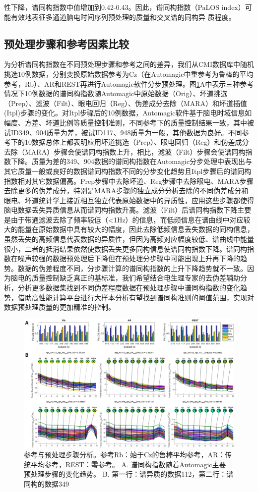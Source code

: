 性下降，谱同构指数中值增加到0.42-0.43。因此，谱同构指数（PaLOS index）可能有效地表征多通道脑电时间序列预处理的质量和交叉谱的同构异
质程度。

\subsection{预处理步骤和参考因素比较}
为分析谱同构指数在不同预处理步骤和参考之间的差异，我们从CMI数据库中随机挑选10例数据，分别变换原始数据参考为Cz（在Automagic中重参考为鲁棒的平均参考，Rb）、AR和REST再进行Automagic软件分步预处理。图\ref{step}A中表示三种参考情况下10例数据的谱同构指数随Automagic中原始数据（Orig）、坏道挑选（Prep）、滤波（Filt）、眼电回归（Reg）、伪差成分去除（MARA）和坏道插值(Itpl)步骤的变化。对Itpl步骤后的10例数据，Automagic软件基于脑电时域信息如幅度、方差、坏道比例等质量控制准则，不同参考下的质量控制结果一致，其中被试ID349、904质量为差，被试ID117、948质量为一般，其他数据为良好。不同参考下的10数据总体上都表明应用坏道挑选（Prep）、眼电回归（Reg）和伪差成分去除（MARA）步骤会使谱同构指数上升，相比，滤波（Filt）步骤会使谱同构指数下降。质量为差的349、904数据的谱同构指数在Automagic分步处理中表现出与其它质量一般或良好的数据谱同构指数不同的分步变化趋势且Itpl步骤后的谱同构指数相对其它数据偏高。Prep步骤中去除坏道、Reg步骤中去除眼电、MARA步骤去除更多的伪差成分，特别是MARA步骤的独立成分分析去除的不同伪差成分和眼电、坏道统计学上接近相互独立代表原始数据中的异质性，应用这些步骤都使得脑电数据丢失异质信息从而谱同构指数升高。滤波（Filt）后谱同构指数下降主要是由于带通滤波去除了频率较低（<1Hz）的信息，而低频信息在谱曲线中对应较大的能量在原始数据中具有较大的幅度，因此去除低频信息丢失数据的同构信息，虽然丢失的高频信息代表数据的异质性，但因为高频对应幅度较低、谱曲线中能量很小，二者的抵消结果依然使数据丢失更多同构信息使谱同构指数下降。谱同构指数在噪声较强的数据预处理后下降但在预处理分步骤中可能出现上升再下降的趋势。数据的伪差程度不同，分步骤计算的谱同构指数的上升下降趋势就不一致。因为脑电的质量控制缺乏真正的基标准，我们希望结合电生理专家的去伪差辅助分析，分析更多数据集找到不同伪差程度数据在预处理步骤中谱同构指数的变化趋势，借助高性能计算平台进行大样本分析有望找到谱同构准则的阈值范围，实现对数据预处理质量的更加精准的控制。
\begin{figure}[!h]
	\includegraphics[width=15cm]{pic/palos/step.png}
	\caption{参考与预处理步骤分析。参考Rb：始于Cz的鲁棒平均参考，AR：传统平均参考，REST：零参考。 A. 谱同构指数随着Automagic主要
	预处理步骤的变化趋势。 B. 第一行：谱异质的数据112，第二行：谱同构的数据349}
	\label{step}
\end{figure}

